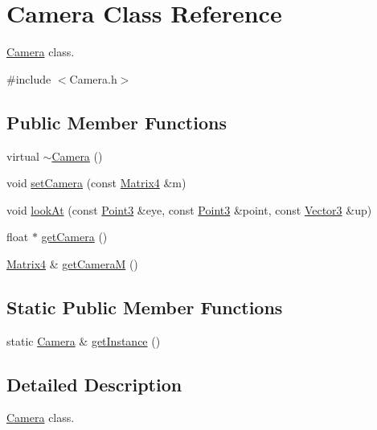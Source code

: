 \hypertarget{classCamera}{\section{Camera Class Reference}
\label{classCamera}
}


\hyperlink{classCamera}{Camera} class.  




{\ttfamily \#include $<$Camera.\-h$>$}

\subsection*{Public Member Functions}
\begin{DoxyCompactItemize}
\item 
virtual \hyperlink{classCamera_ad1897942d0ccf91052386388a497349f}{$\sim$\-Camera} ()
\item 
void \hyperlink{classCamera_a16c5e6f7b2eed95a78675f55c4a435e6}{set\-Camera} (const \hyperlink{classVectormath_1_1Aos_1_1Matrix4}{Matrix4} \&m)
\item 
void \hyperlink{classCamera_aa91c4a447f23e08322ef17f2786851bf}{look\-At} (const \hyperlink{classVectormath_1_1Aos_1_1Point3}{Point3} \&eye, const \hyperlink{classVectormath_1_1Aos_1_1Point3}{Point3} \&point, const \hyperlink{classVectormath_1_1Aos_1_1Vector3}{Vector3} \&up)
\item 
float $\ast$ \hyperlink{classCamera_a25f2f9d8ccc76f38c0580709587afadf}{get\-Camera} ()
\item 
\hyperlink{classVectormath_1_1Aos_1_1Matrix4}{Matrix4} \& \hyperlink{classCamera_a156b6aba4309cde6f0252ff325663e2f}{get\-Camera\-M} ()
\end{DoxyCompactItemize}
\subsection*{Static Public Member Functions}
\begin{DoxyCompactItemize}
\item 
static \hyperlink{classCamera}{Camera} \& \hyperlink{classCamera_aa84baebe5d771ddfd82a5b55bd3fde39}{get\-Instance} ()
\end{DoxyCompactItemize}


\subsection{Detailed Description}
\hyperlink{classCamera}{Camera} class. 

